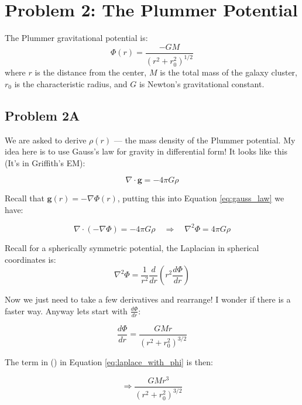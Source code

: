 \section*{Problem 2: The Plummer Potential}

The Plummer gravitational potential is:
\begin{equation}
    \Phi(r) = \frac{-GM}{({r^2 + r_0^2})^{1/2}}
\end{equation}
where \(r\) is the distance from the center, \(M\) is the total mass of the galaxy cluster, \(r_0\) is the characteristic radius, and \(G\) is Newton's gravitational constant.


\subsection*{Problem 2A}
We are asked to derive $\rho(r)$ --- the mass density of the Plummer potential.  My idea here is to use Gauss’s law for gravity in differential form! It looks like this (It's in Griffith's EM):

\begin{equation} \label{eq:gauss_law}
\nabla \cdot \mathbf{g} = -4 \pi G \rho
\end{equation}

Recall that $ \mathbf{g}(r) = - \nabla \Phi(r) $, putting this into Equation \ref{eq:gauss_law} we have:

\begin{equation}\label{eq:laplace_with_G}
\nabla \cdot (- \nabla \Phi) = -4 \pi G \rho \quad \Rightarrow \quad \nabla^2 \Phi = 4 \pi G \rho
\end{equation}

Recall for a spherically symmetric potential, the Laplacian in spherical coordinates is:
\begin{equation} \label{eq:laplace_with_phi}
\nabla^2 \Phi = \frac{1}{r^2} \frac{d}{dr} \left( r^2 \frac{d\Phi}{dr} \right)
\end{equation}

Now we just need to take a few derivatives and rearrange! I wonder if there is a faster way. Anyway lets start with $\frac{d\Phi}{dr}$:

\begin{equation}
\frac{d\Phi}{dr} = \frac{GM r}{(r^2 + r_0^2)^{3/2}}
\end{equation}

The term in () in Equation \ref{eq:laplace_with_phi} is then:

\begin{equation}
\Rightarrow \frac{GM r^3}{(r^2 + r_0^2)^{3/2}}
\end{equation}

